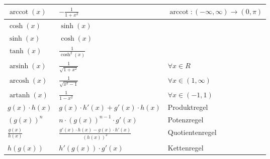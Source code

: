 \documentclass[25pt]{sciposter}
\begin{document}
\begin{multicols}{3}
{\begin{table}[]
\begin{tabular}{@{} p{} p{} p{} @{}}
			$\operatorname{arccot}(x)$ & $ - \frac{1}{1+x^2} $ & $\operatorname{arccot} : (-\infty, \infty) \to (0,\pi)$\\
			\midrule
			$\cosh(x)$ & $\sinh(x)$ &\\
			$\sinh(x)$ & $\cosh(x)$ & \\
			$\tanh(x)$ & $\frac{1}{\cosh^2(x)}$ & \\
			$\operatorname{arsinh}(x)$ & $\frac{1}{\sqrt{1+x^2}}$ & $\forall x \in R$\\
			$\operatorname{arcosh}(x)$ & $\frac{1}{\sqrt{x^2 - 1}}$ & $\forall x \in (1, \infty)$\\		  $\operatorname{artanh}(x)$ & $\frac{1}{1-x^2}$ & $\forall x \in (-1,1)$\\
			\midrule
			$g(x) \cdot h(x)$ & $g(x) \cdot h'(x) + g'(x) \cdot h(x)$ & Produktregel\\
			$\left(g(x)\right)^n$ & $n \cdot \left( g(x) \right)^{n-1} \cdot g'(x)$ & Potenzregel\\
			$\frac{g(x)}{h(x)}$ & $\frac{ g'(x) \cdot h(x) - g(x)\cdot h'(x)}{\left(h(x)\right) ^2}$ & Quotientenregel\\
			$h(g(x))$ & $h'(g(x)) \cdot g'(x)$ & Kettenregel\\
			\bottomrule
		\end{tabular}
	\end{table}
}





\end{multicols}
\end{document}
